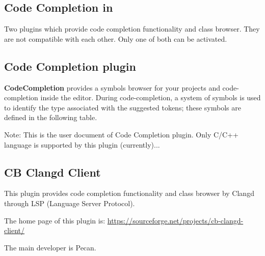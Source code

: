\begin{samepage}
\section{Code Completion in \codeblocks}\label{sec:codecompletion}

Two plugins which provide code completion functionality and class browser. They are not compatible with each other. Only one of both can be activated.

\end{samepage}
 
\subsection{Code Completion plugin}


\textbf{CodeCompletion} provides a symbols browser for your projects and code-completion inside the editor.
During code-completion, a system of symbols is used to identify the type associated with the suggested tokens; these symbols are defined in the following table.


Note: This is the user document of Code Completion plugin.
Only C/C++ language is supported by this plugin (currently)...


\subsection{CB Clangd Client}

This plugin provides code completion functionality and class browser by Clangd through LSP (Language Server Protocol).

The home page of this plugin is: \url{https://sourceforge.net/projects/cb-clangd-client/}

The main developer is Pecan.

